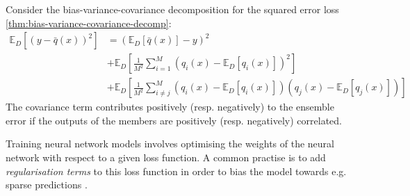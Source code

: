 \documentclass[../main.tex]{subfiles}
\begin{document}
Consider the bias-variance-covariance decomposition for the squared error loss \ref{thm:bias-variance-covariance-decomp}: 
\begin{align*}
\mathbb{E}_{D}\left[ (y - \bar{q}(x))^2 \right]  &= (\mathbb{E}_{D}\left[ \bar{q}(x) \right] - y)^2 \\
& + \mathbb{E}_{D}\left[ \frac{1}{M^2}\sum_{i=1}^M (q_{i}(x) - \mathbb{E}_{D}\left[ q_{i}(x) \right] )^2 \right]  \\
& + \mathbb{E}_{D}\left[ \frac{1}{M^2}\sum_{i \not=j}^M (q_{i}(x) - \mathbb{E}_{D}\left[ q_{i}(x) \right] )(q_{j}(x) - \mathbb{E}_{D}\left[ q_{j}(x) \right] ) \right] 
\end{align*}
The covariance term contributes positively (resp. negatively) to the ensemble error if the outputs of the members are positively (resp. negatively) correlated. 

Training neural network models involves optimising the weights of the neural network with respect to a given loss function. A common practise is to add \textit{regularisation terms} to this loss function in order to bias the model towards e.g. sparse predictions \cite{todo}. 
\end{document}
